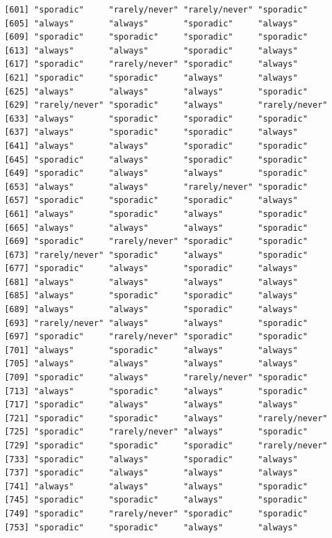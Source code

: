 \documentclass[
  letterpaper,
  DIV=11,
  numbers=noendperiod]{scrartcl}
\begin{document}
\begin{verbatim}
 [601] "sporadic"     "rarely/never" "rarely/never" "sporadic"    
 [605] "always"       "always"       "sporadic"     "always"      
 [609] "sporadic"     "sporadic"     "sporadic"     "sporadic"    
 [613] "always"       "always"       "sporadic"     "always"      
 [617] "sporadic"     "rarely/never" "sporadic"     "always"      
 [621] "sporadic"     "sporadic"     "always"       "always"      
 [625] "always"       "always"       "always"       "sporadic"    
 [629] "rarely/never" "sporadic"     "always"       "rarely/never"
 [633] "always"       "sporadic"     "sporadic"     "sporadic"    
 [637] "always"       "sporadic"     "sporadic"     "always"      
 [641] "always"       "always"       "sporadic"     "sporadic"    
 [645] "sporadic"     "always"       "sporadic"     "sporadic"    
 [649] "sporadic"     "always"       "always"       "sporadic"    
 [653] "always"       "always"       "rarely/never" "sporadic"    
 [657] "sporadic"     "sporadic"     "sporadic"     "always"      
 [661] "always"       "sporadic"     "always"       "sporadic"    
 [665] "always"       "always"       "always"       "sporadic"    
 [669] "sporadic"     "rarely/never" "sporadic"     "sporadic"    
 [673] "rarely/never" "sporadic"     "always"       "sporadic"    
 [677] "sporadic"     "always"       "sporadic"     "always"      
 [681] "always"       "always"       "always"       "always"      
 [685] "always"       "sporadic"     "sporadic"     "always"      
 [689] "always"       "always"       "sporadic"     "always"      
 [693] "rarely/never" "always"       "always"       "sporadic"    
 [697] "sporadic"     "rarely/never" "sporadic"     "sporadic"    
 [701] "always"       "sporadic"     "always"       "always"      
 [705] "always"       "always"       "always"       "always"      
 [709] "sporadic"     "always"       "rarely/never" "sporadic"    
 [713] "always"       "sporadic"     "always"       "sporadic"    
 [717] "sporadic"     "always"       "always"       "always"      
 [721] "sporadic"     "sporadic"     "always"       "rarely/never"
 [725] "sporadic"     "rarely/never" "always"       "sporadic"    
 [729] "sporadic"     "sporadic"     "sporadic"     "rarely/never"
 [733] "sporadic"     "always"       "sporadic"     "always"      
 [737] "sporadic"     "always"       "always"       "always"      
 [741] "always"       "always"       "always"       "sporadic"    
 [745] "sporadic"     "sporadic"     "always"       "sporadic"    
 [749] "sporadic"     "rarely/never" "sporadic"     "sporadic"    
 [753] "sporadic"     "sporadic"     "always"       "always"      

\end{verbatim}
\end{document}
